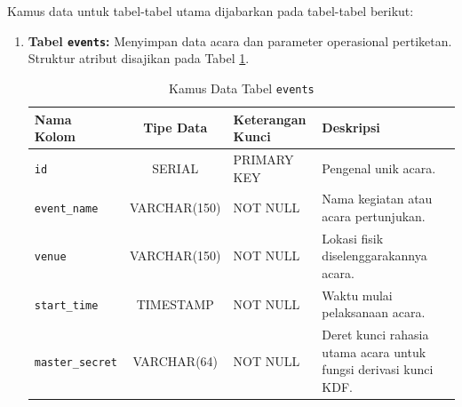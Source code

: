 Kamus data untuk tabel-tabel utama dijabarkan pada tabel-tabel berikut:
\begin{enumerate}
    \item \textbf{Tabel \texttt{events}:} Menyimpan data acara dan parameter operasional pertiketan. Struktur atribut disajikan pada Tabel \ref{tab:table_events}.
    \begin{table}[htbp]
        \caption{Kamus Data Tabel \texttt{events}}
        \label{tab:table_events}
        \centering
        \begin{tabularx}{\textwidth}{ l c l X }
            \toprule
            \textbf{Nama Kolom} & \textbf{Tipe Data} & \textbf{Keterangan Kunci} & \textbf{Deskripsi} \\
            \midrule
            \texttt{id} & SERIAL & PRIMARY KEY & Pengenal unik acara. \\
            \texttt{event\_name} & VARCHAR(150) & NOT NULL & Nama kegiatan atau acara pertunjukan. \\
            \texttt{venue} & VARCHAR(150) & NOT NULL & Lokasi fisik diselenggarakannya acara. \\
            \texttt{start\_time} & TIMESTAMP & NOT NULL & Waktu mulai pelaksanaan acara. \\
            \texttt{master\_secret} & VARCHAR(64) & NOT NULL & Deret kunci rahasia utama acara untuk fungsi derivasi kunci KDF. \\
            \bottomrule
        \end{tabularx}
    \end{table}


\end{enumerate}
